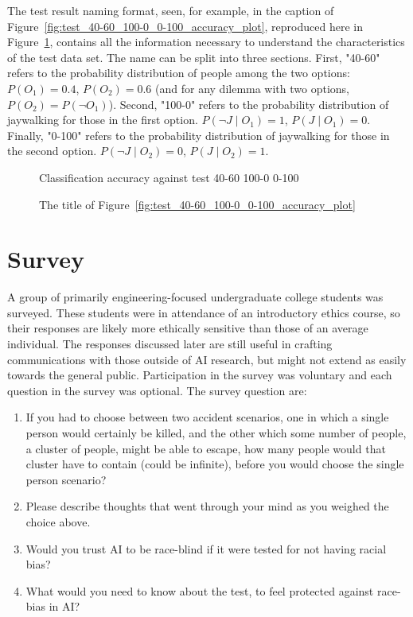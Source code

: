 \documentclass[paper=a4paper]{report}
\begin{document}
The test result naming format, seen, for example, in the caption of
Figure~\ref{fig:test_40-60_100-0_0-100_accuracy_plot}, reproduced here in
Figure~\ref{fig:test_result_naming_example}, contains all the information necessary to understand
the characteristics of the test data set. The name can be split into three sections. First, "40-60"
refers to the probability distribution of people among the two options: $P(O_1) = 0.4$, $P(O_2) =
0.6$ (and for any dilemma with two options, $P(O_2) = P(\neg O_1)$). Second, "100-0" refers to the
probability distribution of jaywalking for those in the first option. $P(\neg J \mid O_1) = 1$, $P(J
\mid O_1) = 0$. Finally, "0-100" refers to the probability distribution of jaywalking for those in
the second option. $P(\neg J \mid O_2) = 0$, $P(J \mid O_2) = 1$.

\begin{figure}[h]
    \centering
    Classification accuracy against test 40-60 100-0 0-100
    \caption{The title of Figure~\ref{fig:test_40-60_100-0_0-100_accuracy_plot}}
    \label{fig:test_result_naming_example}
\end{figure}

\FloatBarrier
\section{Survey}

A group of primarily engineering-focused undergraduate college students was surveyed. These students
were in attendance of an introductory ethics course, so their responses are likely more ethically
sensitive than those of an average individual. The responses discussed later are still useful in
crafting communications with those outside of AI research, but might not extend as easily towards
the general public. Participation in the survey was voluntary and each question in the survey was
optional. The survey question are:
\begin{enumerate}
    \item If you had to choose between two accident scenarios, one in which a single person would
    certainly be killed, and the other which some number of people, a cluster of people, might be
    able to escape, how many people would that cluster have to contain (could be infinite), before
    you would choose the single person scenario?
    \item Please describe thoughts that went through your mind as you weighed the choice above.
    \item Would you trust AI to be race-blind if it were tested for not having racial bias?
    \item What would you need to know about the test, to feel protected against race-bias in AI?
\end{enumerate}
\end{document}
